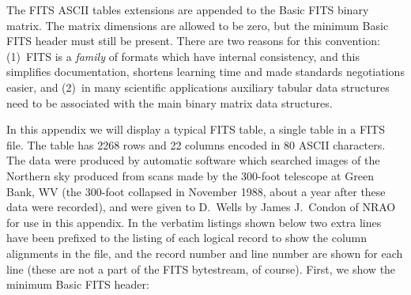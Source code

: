 The FITS ASCII tables extensions are appended to the Basic FITS binary
matrix.  The matrix dimensions are allowed to be zero, but the minimum
Basic FITS header must still be present. There are two reasons for
this convention: (1)~FITS is a {\em family} of formats which have
internal consistency, and this simplifies documentation, shortens
learning time and made standards negotiations easier, and (2)~in many
scientific applications auxiliary tabular data structures need to be
associated with the main binary matrix data structures.

In this appendix we will display a typical FITS table, a single
table in a FITS file. The table has 2268 rows and 22 columns
encoded in 80 ASCII characters. The data were produced by automatic
software which searched images of the Northern sky produced from scans
made by the 300-foot telescope at Green Bank, WV (the 300-foot
collapsed in November 1988, about a year after these data were
recorded), and were given to D.~Wells by James J.~Condon of NRAO for
use in this appendix.  In the verbatim listings shown below two extra
lines have been prefixed to the listing of each logical record to show
the column alignments in the file, and the record number and line
number are shown for each line (these are not a part of the FITS
bytestream, of course). First, we show the minimum Basic FITS header:

